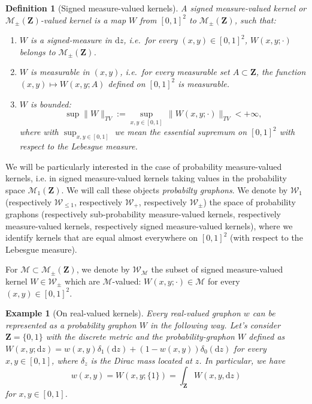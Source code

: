 \documentclass[11pt]{article}
\newtheorem{definition}[theorem]{Definition}
\newtheorem{example}[theorem]{Example}
\newcommand{\cM}{{\mathcal M}}  %
\newcommand{\cW}{{\mathcal W}}  %
\newcommand{\Space}{\mathbf{Z}}
\newcommand{\signed}{\pm}
\newcommand{\Proba}{\mathcal{M}_1(\Space)}
\newcommand{\SignedMeas}{\mathcal{M}_{\pm}(\Space)}
\newcommand{\Graphon}{\mathcal{W}_1}
\newcommand{\SubGraphon}{\mathcal{W}_{\leq 1}}
\newcommand{\Kernel}{\mathcal{W}_{\signed}}
\newcommand{\Kernelp}{\mathcal{W}_{+}}
\newcommand{\drv}{\mathrm{d}}
\newcommand{\rd}{\mathrm{d}}
\begin{document}
\begin{definition}[Signed measure-valued kernels]\label{Def:MeasValuedKernel}
A \emph{signed measure-valued kernel} or \emph{$\SignedMeas$-valued kernel}
is a map $W$ from $[0,1]^2$  to $\SignedMeas$, 
such that:
\begin{enumerate}
\item   $W$  is   a  \emph{signed-measure}   in  $\rd   z$, i.e.\  for   every
  $(x,y) \in [0,1]^2$, $W(x,y;\cdot)$ belongs to $\SignedMeas$.
  
\item $W$ is \emph{measurable} in $(x,y)$, i.e.\ for every measurable set $A\subset \Space$, the function $(x,y)\mapsto W(x,y;A)$ defined on $[0,1]^2$ is measurable.
\item $W$ is \emph{bounded}:
\begin{equation}
   \label{eq:def:TM}
\sup\|W\|_{TV}:=    \sup_{x,y\in [0, 1] }\, \|W(x, y; \cdot)\|_{TV} <+\infty,
  \end{equation}  
  where with  $\sup_{x,y\in [0, 1] }$ we mean the essential supremum on $[0,1]^2$ with respect to the Lebesgue measure.
\end{enumerate}
\end{definition}
We will be particularly interested in the case of probability measure-valued  kernels, i.e. in signed measure-valued kernels taking values in the probability space $\Proba.$ We will call these objects \emph{probabilty graphons}. We denote by  $\Graphon$ (respectively $\SubGraphon$, respectively $\Kernelp$, respectively   $\Kernel$) the space of probability graphons (respectively sub-probability measure-valued kernels, respectively  measure-valued  kernels, respectively signed measure-valued kernels), where we identify kernels that are equal almost everywhere on $[0,1]^2$ (with respect to the Lebesgue measure). 

For  $\cM\subset\SignedMeas$, we denote by $\cW  _\cM$ the subset of signed measure-valued kernel $W\in  \Kernel$ which are $\cM$-valued: $W(x,y; \cdot)\in \cM$ for every $(x,y)\in [0, 1]^2.$

\begin{example}[On real-valued kernels]\label{rem:real-valued-kernels}
Every real-valued  graphon  $w$ can be represented as a probability graphon $W$ in the following way. Let's consider $\Space =\{ 0, 1\}$ with the discrete metric and the probability-graphon $W$ defined as $W(x,y;\drv z)  = w(x,y)  \delta_1(\drv z) +  (1-w(x,y)) \delta_0(\drv z)$ for every $x,y\in[0,1]$, where $\delta_z$ is the Dirac mass located at $z$. In particular, we have $$w(x,y)=W(x,y; \{1\})=\int_{\Space}W(x,y,\drv z)$$ for $x,y \in [0, 1]$. 
\end{example}
\end{document}
